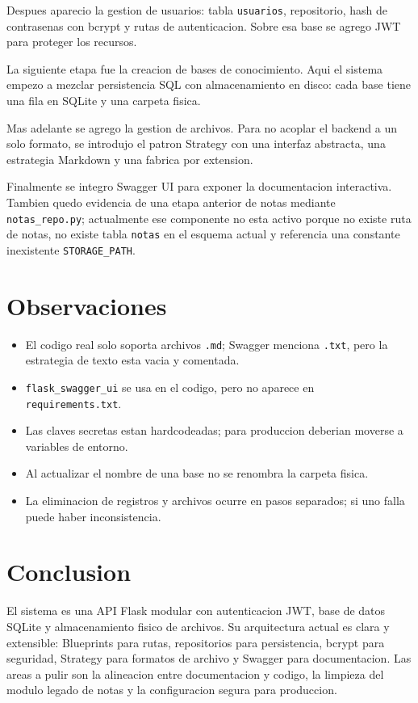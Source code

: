 \documentclass[12pt,a4paper]{article}
\begin{document}
Despues aparecio la gestion de usuarios: tabla \texttt{usuarios}, repositorio, hash de contrasenas con bcrypt y rutas de autenticacion. Sobre esa base se agrego JWT para proteger los recursos.

La siguiente etapa fue la creacion de bases de conocimiento. Aqui el sistema empezo a mezclar persistencia SQL con almacenamiento en disco: cada base tiene una fila en SQLite y una carpeta fisica.

Mas adelante se agrego la gestion de archivos. Para no acoplar el backend a un solo formato, se introdujo el patron Strategy con una interfaz abstracta, una estrategia Markdown y una fabrica por extension.

Finalmente se integro Swagger UI para exponer la documentacion interactiva. Tambien quedo evidencia de una etapa anterior de notas mediante \texttt{notas\_repo.py}; actualmente ese componente no esta activo porque no existe ruta de notas, no existe tabla \texttt{notas} en el esquema actual y referencia una constante inexistente \texttt{STORAGE\_PATH}.

\section{Observaciones}

\begin{itemize}
    \item El codigo real solo soporta archivos \texttt{.md}; Swagger menciona \texttt{.txt}, pero la estrategia de texto esta vacia y comentada.
    \item \texttt{flask\_swagger\_ui} se usa en el codigo, pero no aparece en \texttt{requirements.txt}.
    \item Las claves secretas estan hardcodeadas; para produccion deberian moverse a variables de entorno.
    \item Al actualizar el nombre de una base no se renombra la carpeta fisica.
    \item La eliminacion de registros y archivos ocurre en pasos separados; si uno falla puede haber inconsistencia.
\end{itemize}

\section{Conclusion}

El sistema es una API Flask modular con autenticacion JWT, base de datos SQLite y almacenamiento fisico de archivos. Su arquitectura actual es clara y extensible: Blueprints para rutas, repositorios para persistencia, bcrypt para seguridad, Strategy para formatos de archivo y Swagger para documentacion. Las areas a pulir son la alineacion entre documentacion y codigo, la limpieza del modulo legado de notas y la configuracion segura para produccion.
\end{document}
